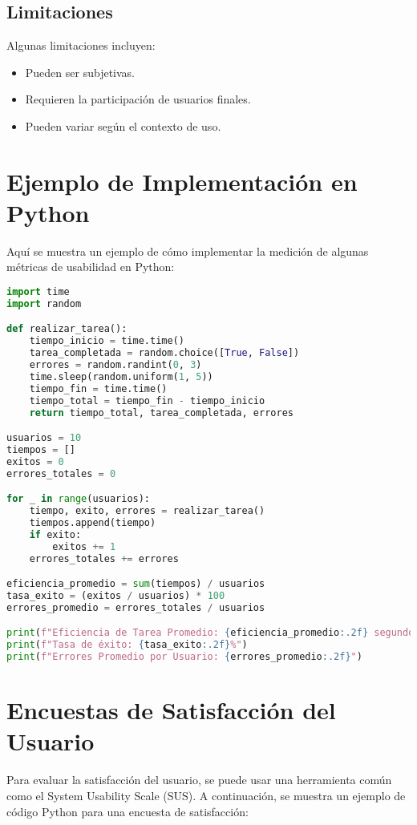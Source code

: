 \documentclass{article}
\begin{document}
\subsection{Limitaciones}

Algunas limitaciones incluyen:

\begin{itemize}
    \item Pueden ser subjetivas.
    \item Requieren la participación de usuarios finales.
    \item Pueden variar según el contexto de uso.
\end{itemize}

\section{Ejemplo de Implementación en Python}

Aquí se muestra un ejemplo de cómo implementar la medición de algunas métricas de usabilidad en Python:

\begin{lstlisting}[language=Python]
import time
import random

def realizar_tarea():
    tiempo_inicio = time.time()
    tarea_completada = random.choice([True, False])
    errores = random.randint(0, 3)
    time.sleep(random.uniform(1, 5))
    tiempo_fin = time.time()
    tiempo_total = tiempo_fin - tiempo_inicio
    return tiempo_total, tarea_completada, errores

usuarios = 10
tiempos = []
exitos = 0
errores_totales = 0

for _ in range(usuarios):
    tiempo, exito, errores = realizar_tarea()
    tiempos.append(tiempo)
    if exito:
        exitos += 1
    errores_totales += errores

eficiencia_promedio = sum(tiempos) / usuarios
tasa_exito = (exitos / usuarios) * 100
errores_promedio = errores_totales / usuarios

print(f"Eficiencia de Tarea Promedio: {eficiencia_promedio:.2f} segundos")
print(f"Tasa de éxito: {tasa_exito:.2f}%")
print(f"Errores Promedio por Usuario: {errores_promedio:.2f}")
\end{lstlisting}

\section{Encuestas de Satisfacción del Usuario}

Para evaluar la satisfacción del usuario, se puede usar una herramienta común
como el System Usability Scale (SUS). A continuación, se muestra un ejemplo de código Python para una encuesta de satisfacción:
\end{document}
